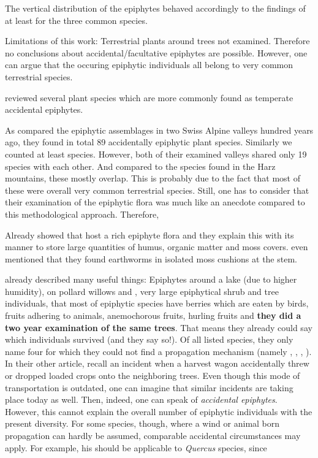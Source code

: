 \documentclass[12pt, a4paper, oneside, draft]{scrartcl}
\begin{document}
The vertical distribution of the epiphytes behaved accordingly to the findings of \textcite{Zotz2003} at least for the three common species.

	
 Limitations of this work: Terrestrial plants around trees not examined. Therefore no conclusions  about accidental/facultative epiphytes are possible. However, one can argue that the occuring epiphytic individuals all belong to very common terrestrial species.


\textcite{Zotz2013} reviewed several plant species which are more commonly found as temperate accidental epiphytes.

 As \textcite[pp.~52]{Staeger1908} compared the epiphytic assemblages in two Swiss Alpine valleys hundred years ago, they found in total 89 accidentally epiphytic plant species. Similarly we counted at least  species. However, both of their examined valleys shared only 19 species with each other. And compared to the species found in the Harz mountains, these mostly overlap. This is probably due to the fact that most of these were overall very common terrestrial species. Still, one has to consider that their examination of the epiphytic flora was much like an anecdote compared to this methodological approach. Therefore, 

Already \textcite{Staeger1912} showed that \apseudoplatanus host a rich epiphyte flora and they explain this with its manner to store large quantities of humus, organic matter and moss covers.  \textcite{Staeger1912} even mentioned that they found earthworms in isolated moss cushions at the stem.

\textcite{Jaap1899} already described many useful things: Epiphytes around a lake (due to higher humidity), on pollard willows and , very large epiphytical shrub and tree individuals, that most of epiphytic species have berries which are eaten by birds, fruits adhering to animals, anemochorous fruits, hurling fruits and \textbf{they did a two year examination of the same trees}. That means they already could say which individuals survived (and they say so!). Of all listed species, they only name four for which they could not find a propagation mechanism (namely \cavellana, \qrobur, \rficaria, \gmollugo). In their other article, \textcite{Jaap1895} recall an incident when a harvest wagon accidentally threw or dropped loaded crops onto the neighboring trees. Even though this mode of transportation is outdated, one can imagine that similar incidents are taking place today as well. Then, indeed, one can speak of \textit{accidental epiphytes}. However, this cannot explain the overall number of epiphytic individuals with the present diversity. For some species, though, where a wind or animal born propagation can hardly be assumed, comparable accidental circumstances may apply. For example, his should be applicable to \textit{Quercus} species, since 
\end{document}
